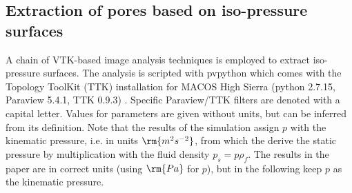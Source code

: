 \documentclass[draft,jgrga]{agutexSI2019}
\begin{document}
\begin{article}
\subsection{Extraction of pores based on iso-pressure surfaces}
A chain of VTK-based image analysis techniques  is employed to extract iso-pressure surfaces. The analysis is scripted with pvpython which comes with the Topology ToolKit (TTK) installation for MACOS High Sierra (python 2.7.15, Paraview 5.4.1, TTK 0.9.3) \cite{tierny_topology_2018}. Specific Paraview/TTK filters are denoted with a capital letter. Values for parameters are given without units, but can be inferred from its definition. Note that the results of the simulation assign $p$ with the kinematic pressure, i.e. in units $\rm{m^2s^{-2}}$, from which the derive the static pressure by multiplication with the fluid density $p_s = p\rho_{f}$. The results in the paper are in correct units (using $\rm{Pa}$ for $p$), but in the following keep $p$ as the kinematic pressure. 


\end{article}
\end{document}

